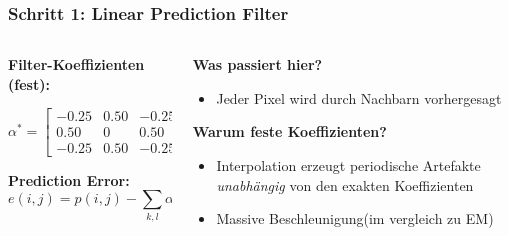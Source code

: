 \documentclass[11pt,t,usepdftitle=false,aspectratio=169]{beamer}
\begin{document}
\begin{frame}
	\frametitle{Schritt 1: Linear Prediction Filter}
	
	\begin{columns}[T]
		\begin{column}{0.45\textwidth}
			\textbf{Filter-Koeffizienten (fest):}
			\vspace{0.5em}
			
			$$\alpha^* = \begin{bmatrix} 
			-0.25 & 0.50 & -0.25 \\
			0.50 & 0 & 0.50 \\
			-0.25 & 0.50 & -0.25
			\end{bmatrix}$$
			
			\vspace{0.5em}
			\textbf{Prediction Error:}
			$$e(i,j) = p(i,j) - \sum_{k,l} \alpha^*_{k,l} \cdot p(i+k,j+l)$$
		\end{column}
		\begin{column}{0.5\textwidth}
			\textbf{Was passiert hier?}
			\begin{itemize}
				\item Jeder Pixel wird durch Nachbarn vorhergesagt
			\end{itemize}
			
			\vspace{0.5em}
			\textbf{Warum feste Koeffizienten?}
			\begin{itemize}
				\item Interpolation erzeugt periodische Artefakte \textit{unabhängig} von den exakten Koeffizienten
				\item Massive Beschleunigung(im vergleich zu EM)
			\end{itemize}
		\end{column}
	\end{columns}
\end{frame}
\end{document}
